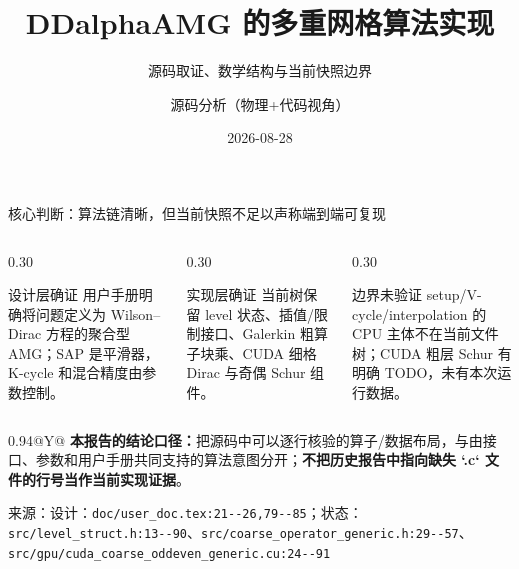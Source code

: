 \documentclass[UTF8,aspectratio=169,11pt]{ctexbeamer}
\title[DDalphaAMG 多重网格]{DDalphaAMG 的多重网格算法实现}
\subtitle{源码取证、数学结构与当前快照边界}
\author[源码分析]{源码分析（物理+代码视角）}
\institute{DDalphaAMG Wilson--Clover 求解器快照}
\date{2026-08-28}
\newcommand{\source}[1]{%
  \vspace{0.06em}\par{\raggedright\scriptsize\color{muted}来源：#1\par}}
\newcommand{\verified}{\textcolor{evidence}{确证}}
\newcommand{\unverified}{\textcolor{warning}{未验证}}
\newcommand{\code}[1]{\nolinkurl{#1}}
\begin{document}
\begin{frame}[plain]
  \titlepage
\end{frame}

\begin{frame}[t]{核心判断：算法链清晰，但当前快照不足以声称端到端可复现}
  \begin{columns}[T,totalwidth=\textwidth]
    \begin{column}{0.30\textwidth}
      \begin{block}{设计层\;\verified}
        用户手册明确将问题定义为 Wilson--Dirac 方程的聚合型 AMG；SAP 是平滑器，K-cycle 和混合精度由参数控制。
      \end{block}
    \end{column}
    \begin{column}{0.30\textwidth}
      \begin{block}{实现层\;\verified}
        当前树保留 level 状态、插值/限制接口、Galerkin 粗算子块乘、CUDA 细格 Dirac 与奇偶 Schur 组件。
      \end{block}
    \end{column}
    \begin{column}{0.30\textwidth}
      \begin{block}{边界\;\unverified}
        setup/V-cycle/interpolation 的 CPU 主体不在当前文件树；CUDA 粗层 Schur 有明确 TODO，未有本次运行数据。
      \end{block}
    \end{column}
  \end{columns}
  \vspace{0.25cm}
  \begin{center}
    \begin{tabularx}{0.94\textwidth}{@{}Y@{}}
      \toprule
      \textbf{本报告的结论口径：}把源码中可以逐行核验的算子/数据布局，与由接口、参数和用户手册共同支持的算法意图分开；\textbf{不把历史报告中指向缺失 `.c` 文件的行号当作当前实现证据}。\\
      \bottomrule
    \end{tabularx}
  \end{center}
  \source{设计：\code{doc/user_doc.tex:21--26,79--85}；状态：\code{src/level_struct.h:13--90}、\code{src/coarse_operator_generic.h:29--57}、\code{src/gpu/cuda_coarse_oddeven_generic.cu:24--91}}
\end{frame}
\end{document}

